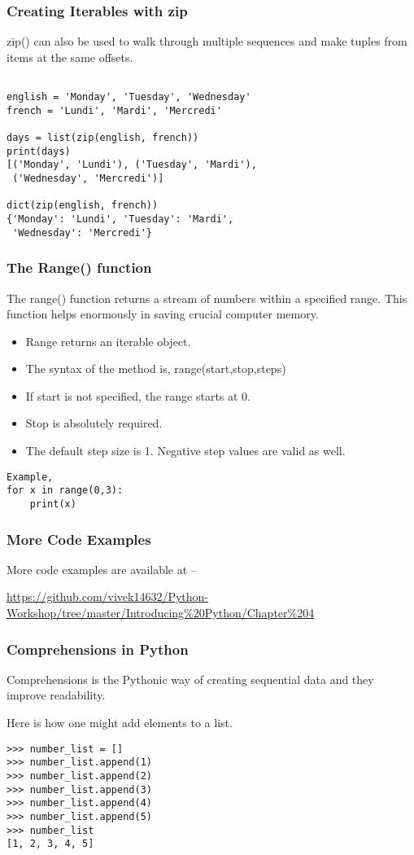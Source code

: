 \documentclass{beamer}
\begin{document}
\begin{frame}[fragile]
\frametitle{Creating Iterables with zip}
zip() can also be used to walk through multiple sequences and make tuples from items at the same offsets.
\begin{lstlisting}	

english = 'Monday', 'Tuesday', 'Wednesday'
french = 'Lundi', 'Mardi', 'Mercredi'

days = list(zip(english, french))
print(days)
[('Monday', 'Lundi'), ('Tuesday', 'Mardi'),
 ('Wednesday', 'Mercredi')]

dict(zip(english, french))
{'Monday': 'Lundi', 'Tuesday': 'Mardi',
 'Wednesday': 'Mercredi'}
\end{lstlisting}

\end{frame}

\begin{frame}[fragile]
\frametitle{The Range() function}
The range() function returns a stream of numbers within a specified range. This function helps enormously in saving crucial computer memory.
\begin{itemize}
\item Range returns an iterable object.
\item The syntax of the method is, range(start,stop,steps)
\item If start is not specified, the range starts at 0.
\item Stop is absolutely required.
\item The default step size is 1. Negative step values are valid as well.
\end{itemize}
\begin{lstlisting}
Example,
for x in range(0,3):
	print(x)

\end{lstlisting}
\end{frame}

\begin{frame}
\frametitle{More Code Examples}
More code examples are available at --
 
\url{https://github.com/vivek14632/Python-Workshop/tree/master/Introducing\%20Python/Chapter\%204}
\end{frame}

\begin{frame}[fragile]
\frametitle{Comprehensions in Python}
Comprehensions is the Pythonic way of creating sequential data and they improve readability.

Here is how one might add elements to a list.
\begin{lstlisting}
>>> number_list = []
>>> number_list.append(1)
>>> number_list.append(2)
>>> number_list.append(3)
>>> number_list.append(4)
>>> number_list.append(5)
>>> number_list
[1, 2, 3, 4, 5]
\end{lstlisting}
\end{frame}
\end{document}
